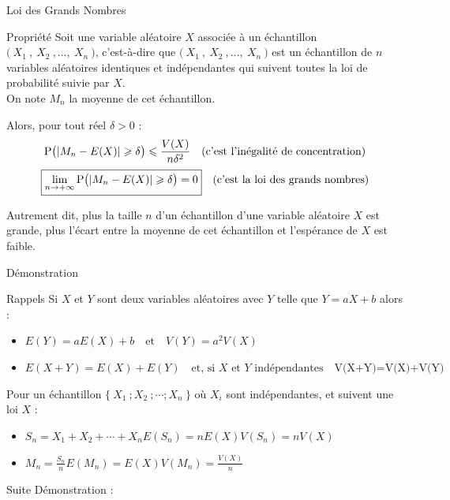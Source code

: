 \documentclass{coursbook}
\begin{document}
    \begin{Gpartie}{Loi des Grands Nombres}
        \vspace*{-2ex}
        \begin{Spartie}{Propriété} 
            Soit une variable aléatoire $X$ associée à un échantillon $\big(~X_1~,~X_2~,\dotsc,~X_n~\big)$, c'est-à-dire que $\big(~X_1~,~X_2~,\dotsc,~X_n~\big)$ est un échantillon de $n$ variables aléatoires identiques et indépendantes qui suivent toutes la loi de probabilité suivie par $X$. \ \\ On note $M_n$ la moyenne de cet échantillon. 
            
            Alors, pour tout réel $\delta>0$ : \[\Pde\big(\lvert M_n-E(X)\rvert\geq\delta\big)\leq\frac{V(X)}{n\delta^2}\quad\text{(c'est l'inégalité de concentration)}\]\[\boxed{\lim\limits_{n\to +\infty}\mathrm{P}\big(\lvert M_n-E(X)\rvert\geqslant\delta\big)=0}\quad\text{(c'est la loi des grands nombres)}\]

            Autrement dit, plus la taille $n$ d'un échantillon d'une variable aléatoire $X$ est grande, plus l'écart entre la moyenne de cet échantillon et l'espérance de $X$ est faible.
            \begin{SSpartie}{Démonstration} 
                \vspace*{-2ex}
                \begin{SSSpartie}{Rappels} 
                    Si $X$ et $Y$ sont deux variables aléatoires avec $Y$ telle que $Y=aX+b$ alors :
                    \begin{itemize}
                        \item $E(Y)=aE(X)+b\quad\text{et}\quad V(Y)=a^2V(X)$
                        \item $E(X+Y)=E(X)+E(Y)\quad\text{et, si $X$ et $Y$ indépendantes}\quad \mbox{V(X+Y)=V(X)+V(Y)}$
                    \end{itemize}

                    Pour un échantillon $\big\{~X_1~;X_2~;\dotsb;X_n ~\big\}$ où $X_i$ sont indépendantes, et suivent une loi $X$ :
                    \begin{itemize}
                        \item $S_n=X_1+X_2+\dotsb+X_n$\quad$E\left(S_n\right)=nE(X)$\quad$V\left(S_n\right)=nV(X)$
                        \item $M_n=\frac{S_n}{n}$\quad$E\left(M_n\right)=E(X)$\quad$V\left(M_n\right)=\frac{V(X)}{n}$
                    \end{itemize}
                \end{SSSpartie}
                Suite Démonstration :


\end{SSpartie}
\end{Spartie}
\end{Gpartie}
\end{document}
